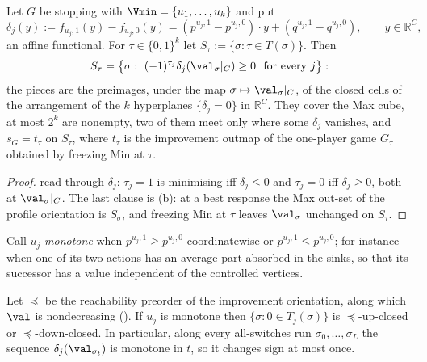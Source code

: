 \begin{theorem}\label{mb:pieces}
Let $G$ be stopping with $\Vmin=\{u_1,\dots,u_k\}$ and put
\[
  \delta_j(y):=f_{u_j,1}(y)-f_{u_j,0}(y)
  =(p^{u_j,1}-p^{u_j,0})\cdot y+(q^{u_j,1}-q^{u_j,0}),
  \qquad y\in\mathbb R^{C},
\]
an affine functional. For $\tau\in\{0,1\}^{k}$ let
$S_\tau:=\{\sigma:\tau\in T(\sigma)\}$. Then
\[
  S_\tau=\bigl\{\sigma:\ (-1)^{\tau_j}\delta_j(\val_\sigma|_C)\ge0
  \ \text{ for every }j\bigr\}:
\]
the pieces are the preimages, under the map $\sigma\mapsto\val_\sigma|_C$,
of the closed cells of the arrangement of the $k$ hyperplanes
$\{\delta_j=0\}$ in $\mathbb R^{C}$. They cover the Max cube, at most
$2^{k}$ are nonempty, two of them meet only where some $\delta_j$
vanishes, and $s_G=t_\tau$ on $S_\tau$, where $t_\tau$ is the improvement
outmap of the one-player game $G_\tau$ obtained by freezing Min at $\tau$.
\end{theorem}

\begin{proof}
 read through $\delta_j$: $\tau_j=1$ is minimising iff
$\delta_j\le0$ and $\tau_j=0$ iff $\delta_j\ge0$, both at
$\val_\sigma|_C$. The last clause is (b): at a best
response the Max out-set of the profile orientation is $S_\sigma$, and
freezing Min at $\tau$ leaves $\val_\sigma$ unchanged on $S_\tau$.
\end{proof}

\begin{definition}\label{mb:monotone}
Call $u_j$ \emph{monotone} when $p^{u_j,1}\ge p^{u_j,0}$ coordinatewise or
$p^{u_j,1}\le p^{u_j,0}$; for instance when one of its two actions has an
average part absorbed in the sinks, so that its successor has a value
independent of the controlled vertices.
\end{definition}

\begin{corollary}\label{mb:updown}
Let $\preceq$ be the reachability preorder of the improvement
orientation, along which $\val$ is nondecreasing (). If
$u_j$ is monotone then $\{\sigma:0\in T_j(\sigma)\}$ is $\preceq$-up-closed
or $\preceq$-down-closed. In particular, along every all-switches run
$\sigma_0,\dots,\sigma_L$ the sequence $\delta_j(\val_{\sigma_t})$ is
monotone in $t$, so it changes sign at most once.
\end{corollary}

